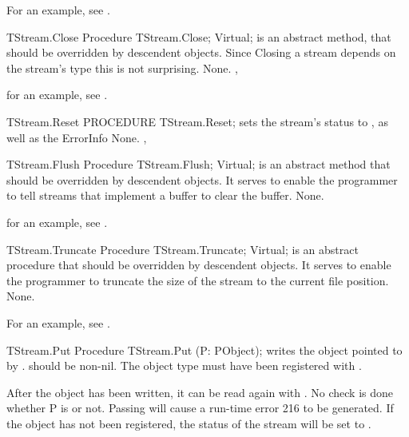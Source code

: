 For an example, see .

\begin{procedure}{TStream.Close}
\Declaration
Procedure TStream.Close; Virtual;
\Description
{} is an abstract method, that should be overridden by descendent
objects. Since Closing a stream depends on the stream's type this is not
surprising.
\Errors
None.
\SeeAlso
{}, 
\end{procedure}

for an example, see .

\begin{procedure}{TStream.Reset}
\Declaration
PROCEDURE TStream.Reset;
\Description
{} sets the stream's status to , as well as the ErrorInfo
\Errors
None.
\SeeAlso
{}, 
\end{procedure}

\begin{procedure}{TStream.Flush}
\Declaration 
Procedure TStream.Flush; Virtual;
\Description
{} is an abstract method that should be overridden by descendent
objects. It serves to enable the programmer to tell streams that implement 
a buffer to clear the buffer.
\Errors
None.
\SeeAlso
{}
\end{procedure}

for an example, see .

\begin{procedure}{TStream.Truncate}
\Declaration
Procedure TStream.Truncate; Virtual;
\Description
{} is an abstract procedure that should be overridden by
descendent objects. It serves to enable the programmer to truncate the
size of the stream to the current file position.
\Errors
None.
\SeeAlso
{}
\end{procedure}

For an example, see .

\begin{procedure}{TStream.Put}
\Declaration
Procedure TStream.Put (P: PObject);
\Description
{} writes the object pointed to by .  should be
non-nil. The object type must have been registered with .

After the object has been written, it can be read again with .
\Errors
No check is done whether P is  or not. Passing  will cause
a run-time error 216 to be generated. If the object has not been registered,
the status of the stream will be set to .
\SeeAlso
{}
\end{procedure}

